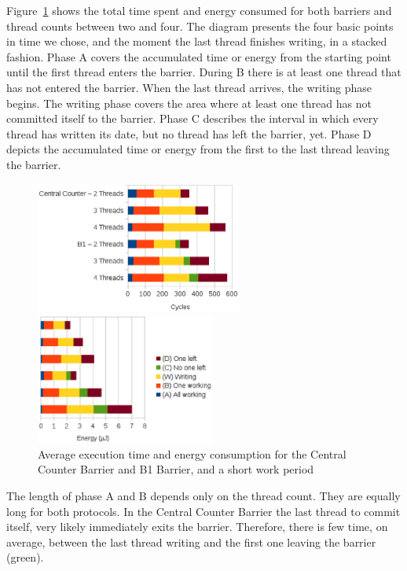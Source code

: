 \documentclass[a4paper, 10pt]{article}
\begin{document}
Figure~\ref{fig:c1-work-100-partition} shows the total time spent and energy consumed for both barriers and thread counts between two and four.
The diagram presents the four basic points in time we chose, and the moment the last thread finishes writing, in a stacked fashion.
Phase A covers the accumulated time or energy from the starting point until the first thread enters the barrier.
During B there is at least one thread that has not entered the barrier. When the last thread arrives, the writing phase begins.
The writing phase covers the area where at least one thread has not committed itself to the barrier.
Phase C describes the interval in which every thread has written its date, but no thread has left the barrier, yet.
Phase D depicts the accumulated time or energy from the first to the last thread leaving the barrier.
\begin{figure}[htbp]
	\centering
	\begin{minipage}{0.53\linewidth}
		\includegraphics[height=4.3cm]{charts/c1-time-work-100-partition}
	\end{minipage}
	\begin{minipage}{0.46\linewidth}
		\includegraphics[height=4.3cm]{charts/c1-energy-work-100-partition}
	\end{minipage}
	\caption{Average execution time and energy consumption for the Central Counter Barrier and B1 Barrier, and a short work period}
	\label{fig:c1-work-100-partition}
\end{figure}

The length of phase A and B depends only on the thread count. They are equally long for both protocols.
In the Central Counter Barrier the last thread to commit itself, very likely immediately exits the barrier. Therefore, there is few time, on average, between the last thread writing and the first one leaving the barrier (green).
\end{document}
